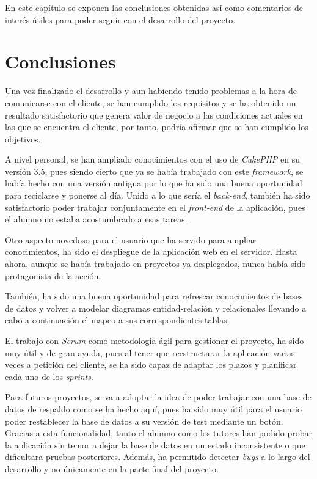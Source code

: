 
En este capítulo se exponen las conclusiones obtenidas así como comentarios de interés útiles para poder seguir con el desarrollo del proyecto.

\section{Conclusiones}

Una vez finalizado el desarrollo y aun habiendo tenido problemas a la hora de comunicarse con el cliente, se han cumplido los requisitos y se ha obtenido un resultado satisfactorio que genera valor de negocio a las condiciones actuales en las que se encuentra el cliente, por tanto, podría afirmar que se han cumplido los objetivos.

A nivel personal, se han ampliado conocimientos con el uso de \textit{CakePHP} en su versión 3.5, pues siendo cierto que ya se había trabajado con este \textit{framework}, se había hecho con una versión antigua por lo que ha sido una buena oportunidad para reciclarse y ponerse al día. Unido a lo que sería el \textit{back-end}, también ha sido satisfactorio poder trabajar conjuntamente en el \textit{front-end} de la aplicación, pues el alumno no estaba acostumbrado a esas tareas.

Otro aspecto novedoso para el usuario que ha servido para ampliar conocimientos, ha sido el despliegue de la aplicación web en el servidor. Hasta ahora, aunque se había trabajado en proyectos ya desplegados, nunca había sido protagonista de la acción.

También, ha sido una buena oportunidad para refrescar conocimientos de bases de datos y volver a modelar diagramas entidad-relación y relacionales llevando a cabo a continuación el mapeo a sus correspondientes tablas. 

El trabajo con \textit{Scrum} como metodología ágil para gestionar el proyecto, ha sido muy útil y de gran ayuda, pues al tener que reestructurar la aplicación varias veces a petición del cliente, se ha sido capaz de adaptar los plazos y planificar cada uno de los \textit{sprints}. 

Para futuros proyectos, se va a adoptar la idea de poder trabajar con una base de datos de respaldo como se ha hecho aquí, pues ha sido muy útil para el usuario poder restablecer la base de datos a su versión de test mediante un botón. Gracias a esta funcionalidad, tanto el alumno como los tutores han podido probar la aplicación sin temor a dejar la base de datos en un estado inconsistente o que dificultara pruebas posteriores. Además, ha permitido detectar \textit{bugs} a lo largo del desarrollo y no únicamente en la parte final del proyecto.

